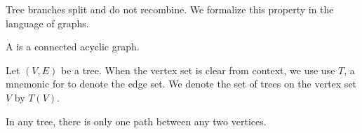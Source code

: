 
\sbasic



\sstart



Tree branches split
and do not recombine.
We formalize this
property in the
language of graphs.


A
is a
connected
acyclic graph.


Let $(V, E)$ be a tree.
When the vertex set is clear
from context, we use
use $T$, a mnemonic for 
to denote the edge set.
We denote the set of trees
on the vertex set $V$ by
$T(V)$.


\begin{prop}
  In any tree,
  there is only one
  path between
  any two vertices.
\end{prop}

\strats
